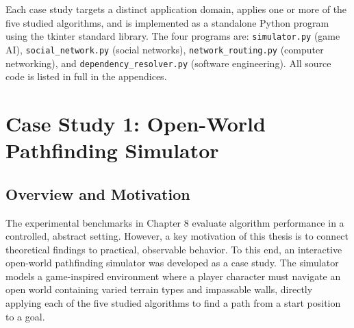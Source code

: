 \documentclass[12pt, a4paper, oneside]{report}
\theoremstyle{definition}
\begin{document}
Each case study targets a distinct application domain, applies one or more of the five studied algorithms, and is implemented as a standalone Python program using the tkinter standard library. The four programs are: \texttt{simulator.py} (game AI), \texttt{social\_network.py} (social networks), \texttt{network\_routing.py} (computer networking), and \texttt{dependency\_resolver.py} (software engineering). All source code is listed in full in the appendices.

\begin{table}[H]
\centering
\caption{Overview of Case Study Applications}
\label{tab:case_study_overview}
\end{table}

\chapter{Case Study 1: Open-World Pathfinding Simulator}
\label{ch:cs1}

\section{Overview and Motivation}

The experimental benchmarks in Chapter 8 evaluate algorithm performance in a controlled, abstract setting. However, a key motivation of this thesis is to connect theoretical findings to practical, observable behavior. To this end, an interactive open-world pathfinding simulator was developed as a case study. The simulator models a game-inspired environment where a player character must navigate an open world containing varied terrain types and impassable walls, directly applying each of the five studied algorithms to find a path from a start position to a goal.
\end{document}
